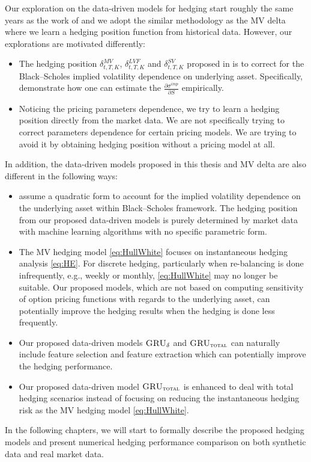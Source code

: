 \documentclass[letterpaper,12pt,titlepage,oneside,final]{book}
\numberwithin{equation}{section}
\theoremstyle{definition}
\newcommand{\model}{\textsc{GRU}_\delta}
\newcommand{\modelT}{\textsc{GRU}_{\textsc{total}}}
\begin{document}
Our exploration on the data-driven models for hedging start roughly the same years as the work of \cite{hulloptimal} and we adopt the similar methodology as the MV delta where we learn a hedging position function from historical data. However, our explorations are motivated differently:
\begin{itemize}
    \item The hedging position  $\delta^{MV}_{t,T,K}$, $\delta^{LVF}_{t,T,K}$ and $\delta^{SV}_{t,T,K}$ proposed in \cite{hulloptimal} is to correct for the Black–Scholes implied volatility dependence on underlying asset. Specifically, \citet{hulloptimal} demonstrate how one can estimate the $\frac{\partial \sigma^{imp}}{\partial S}$ empirically.
    \item Noticing the pricing parameters dependence, we try to learn a hedging position directly from the market data.  We are not specifically trying to correct  parameters dependence for certain pricing models. We are trying to avoid it  by obtaining hedging position without a pricing model at all.
\end{itemize}
In addition, the data-driven models proposed in this thesis and MV delta are also different in the following ways:
\begin{itemize}
    \item \citet{hulloptimal} assume a quadratic form to account for the implied volatility dependence on the underlying asset within Black–Scholes framework.  The hedging position from our proposed data-driven models is  purely determined by market data with machine learning algorithms with no specific parametric form.
    \item The MV hedging model \eqref{eq:HullWhite} focuses on instantaneous hedging analysis  \eqref{eq:HE}. For discrete hedging, particularly when re-balancing is done infrequently, e.g., weekly or monthly, \eqref{eq:HullWhite}   may no longer be suitable. Our proposed models, which are not based on computing sensitivity of option pricing functions with regards to the underlying asset, can potentially improve the hedging results when the hedging is done less frequently.
    \item Our proposed data-driven models $\model$ and $\modelT$ can naturally include feature selection and feature extraction which can potentially improve the hedging performance.
    \item Our proposed data-driven model $\modelT$ is enhanced to deal with total hedging scenarios instead of focusing on reducing the instantaneous hedging risk as the   MV hedging model \eqref{eq:HullWhite}.
\end{itemize}
In the following chapters, we will start to formally describe the proposed hedging models and present numerical hedging performance comparison on both synthetic data and real market data.
\end{document}
